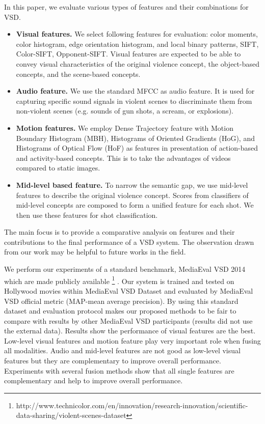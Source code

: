 \documentclass[review]{elsarticle}
\begin{document}
In this paper, we evaluate various types of features and their combinations for VSD. 
\begin{itemize}
	\item {\bf Visual features.} We select following features for evaluation: color moments, color histogram, edge orientation histogram, and local binary patterns, SIFT, Color-SIFT, Opponent-SIFT. Visual features are expected to be able to convey visual characteristics of the original violence concept, the object-based concepts, and the scene-based concepts.
	\item {\bf Audio feature.} We use the standard MFCC as audio feature. It is used for capturing specific sound signals in violent scenes to discriminate them from non-violent scenes (e.g. sounds of gun shots, a scream, or explosions). 
	\item {\bf Motion features.} We employ Dense Trajectory feature with Motion Boundary Histogram (MBH), Histograms of Oriented Gradients (HoG), and Histograms of Optical Flow (HoF) as features in presentation of action-based and activity-based concepts. This is to take the advantages of videos compared to static images.  
	\item {\bf Mid-level based feature.} To narrow the semantic gap, we use mid-level features to describe the original violence concept. Scores from classifiers of mid-level concepts are composed to form a unified feature for each shot. We then use these features for shot classification.
\end{itemize}
The main focus is to provide a comparative analysis on features and their contributions to the final performance of a VSD system. The observation drawn from our work may be helpful to future works in the field.

We perform our experiments of a standard benchmark, MediaEval VSD 2014\cite{demarty2014benchmarking} which are made publicly available \footnote{http://www.technicolor.com/en/innovation/research-innovation/scientific-data-sharing/violent-scenes-dataset} . Our system is trained and tested on Hollywood movies within MediaEval VSD Dataset and evaluated by MediaEval VSD official metric (MAP-mean average precision). By using this standard dataset and evaluation protocol makes our proposed methods to be fair to compare with results by other MediaEval VSD participants (results did not use the external data). Results show the performance of visual features are the best. Low-level visual features and motion feature play very important role when fusing all modalities. Audio and mid-level features are not good as low-level visual features but they are complementary to improve overall performance. Experiments with several fusion methods show that all single features are complementary and help to improve overall performance.
\end{document}
